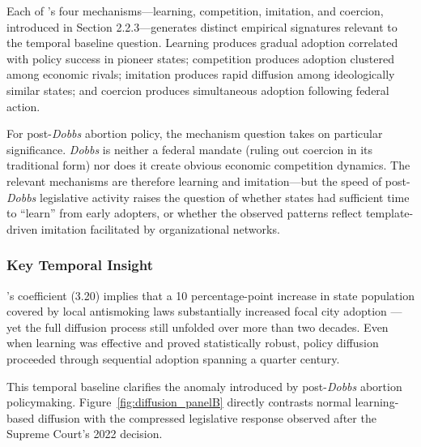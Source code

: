 Each of \textcite{shipanMechanismsPolicyDiffusion2008a}'s four mechanisms—learning, competition, imitation, and coercion, introduced in Section 2.2.3---generates distinct empirical signatures relevant to the temporal baseline question. Learning produces gradual adoption correlated with policy success in pioneer states; competition produces adoption clustered among economic rivals; imitation produces rapid diffusion among ideologically similar states; and coercion produces simultaneous adoption following federal action.

For post-\emph{Dobbs} abortion policy, the mechanism question takes on particular significance. \textit{Dobbs} is neither a federal mandate (ruling out coercion in its traditional form) nor does it create obvious economic competition dynamics. The relevant mechanisms are therefore learning and imitation---but the speed of post-\emph{Dobbs} legislative activity raises the question of whether states had sufficient time to ``learn'' from early adopters, or whether the observed patterns reflect template-driven imitation facilitated by organizational networks.

\subsubsection{Key Temporal Insight}
\textcite{shipanMechanismsPolicyDiffusion2008a}'s coefficient (3.20) implies that a 10 percentage-point increase in state population covered by local antismoking laws substantially increased focal city adoption ---yet the full diffusion process still unfolded over more than two decades. Even when learning was effective and proved statistically robust, policy diffusion proceeded through sequential adoption spanning a quarter century.

This temporal baseline clarifies the anomaly introduced by post-\emph{Dobbs} abortion policymaking. Figure~\ref{fig:diffusion_panelB} directly contrasts normal learning-based diffusion with the compressed legislative response observed after the Supreme Court's 2022 decision.

